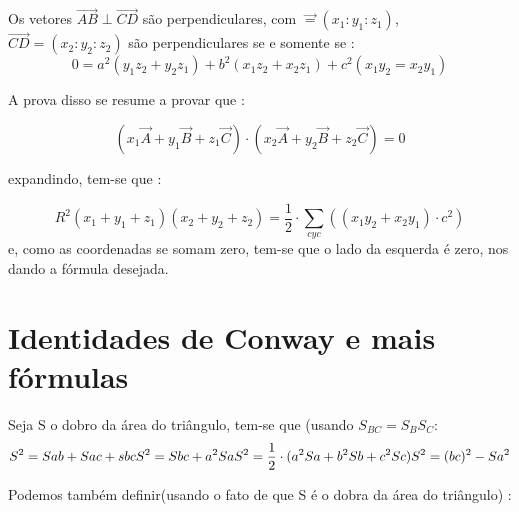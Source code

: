 \documentclass{article}
\begin{document}
\begin{tcolorbox}[colback=green!5!white,colframe=green!75!black,title=Perpendiculares Baricêntricas(coordenadas homogêneas)\emoji{goblin}]
Os vetores $\overrightarrow{AB} \perp \overrightarrow{CD} $ são perpendiculares, com $\overrightarrow = (x_1 : y_1 : z_1)$, $\overrightarrow{CD} = (x_2 : y_2 : z_2)$ são perpendiculares se e somente se : 
$$
0 = a^2(y_1z_2 + y_2z_1) + b^2(x_1z_2 + x_2z_1) + c^2(x_1y_2 = x_2y_1)
$$
\end{tcolorbox}

A prova disso se resume a provar que : 

$$
(x_1 \overrightarrow{A} + y_1 \overrightarrow{B} + z_1 \overrightarrow{C}) \cdot (x_2 \overrightarrow{A} +  y_2 \overrightarrow{B} + z_2 \overrightarrow{C}) = 0
$$

expandindo, tem-se que :

$$
R^2(x_1 +  y_1 + z_1)(x_2 + y_2 + z_2) = \frac{1}{2} \cdot \sum_{cyc} ((x_1 y_2 + x_2 y_1) \cdot c^2) 
$$
e, como as coordenadas se somam zero, tem-se que o lado da esquerda é zero, nos dando a fórmula desejada.

\section{Identidades de Conway e mais fórmulas}
Seja S o dobro da área do triângulo, tem-se que (usando $S_{BC} = S_B S_C$: 
$$
S^2 = Sab + Sac + sbc \\
S^2 = Sbc + a^2 Sa\\
S^2 = \frac{1}{2} \cdot (a^2 Sa + b^2 Sb + c^2 Sc) \\
S^2 = (bc)^2 - Sa^2
$$

Podemos também definir(usando o fato de que S é o dobra da área do triângulo) :
\end{document}
